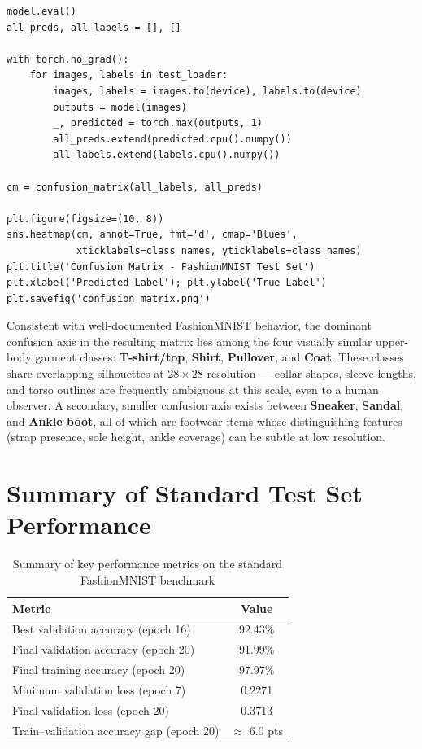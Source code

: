 \documentclass[12pt,a4paper]{report}
\begin{document}
\begin{lstlisting}[caption={Confusion matrix computation and visualization}, label={lst:cm}]
model.eval()
all_preds, all_labels = [], []

with torch.no_grad():
    for images, labels in test_loader:
        images, labels = images.to(device), labels.to(device)
        outputs = model(images)
        _, predicted = torch.max(outputs, 1)
        all_preds.extend(predicted.cpu().numpy())
        all_labels.extend(labels.cpu().numpy())

cm = confusion_matrix(all_labels, all_preds)

plt.figure(figsize=(10, 8))
sns.heatmap(cm, annot=True, fmt='d', cmap='Blues',
            xticklabels=class_names, yticklabels=class_names)
plt.title('Confusion Matrix - FashionMNIST Test Set')
plt.xlabel('Predicted Label'); plt.ylabel('True Label')
plt.savefig('confusion_matrix.png')
\end{lstlisting}

Consistent with well-documented FashionMNIST behavior, the dominant confusion axis in the resulting matrix lies among the four visually similar upper-body garment classes: \textbf{T-shirt/top}, \textbf{Shirt}, \textbf{Pullover}, and \textbf{Coat}. These classes share overlapping silhouettes at $28\times28$ resolution — collar shapes, sleeve lengths, and torso outlines are frequently ambiguous at this scale, even to a human observer. A secondary, smaller confusion axis exists between \textbf{Sneaker}, \textbf{Sandal}, and \textbf{Ankle boot}, all of which are footwear items whose distinguishing features (strap presence, sole height, ankle coverage) can be subtle at low resolution.

\section{Summary of Standard Test Set Performance}

\begin{table}[H]
\centering
\caption{Summary of key performance metrics on the standard FashionMNIST benchmark}
\label{tab:summary1}
\begin{tabular}{@{}lc@{}}
\toprule
\textbf{Metric} & \textbf{Value} \\
\midrule
Best validation accuracy (epoch 16) & 92.43\% \\
Final validation accuracy (epoch 20) & 91.99\% \\
Final training accuracy (epoch 20) & 97.97\% \\
Minimum validation loss (epoch 7) & 0.2271 \\
Final validation loss (epoch 20) & 0.3713 \\
Train--validation accuracy gap (epoch 20) & $\approx$ 6.0 pts \\
\bottomrule
\end{tabular}
\end{table}
\end{document}
